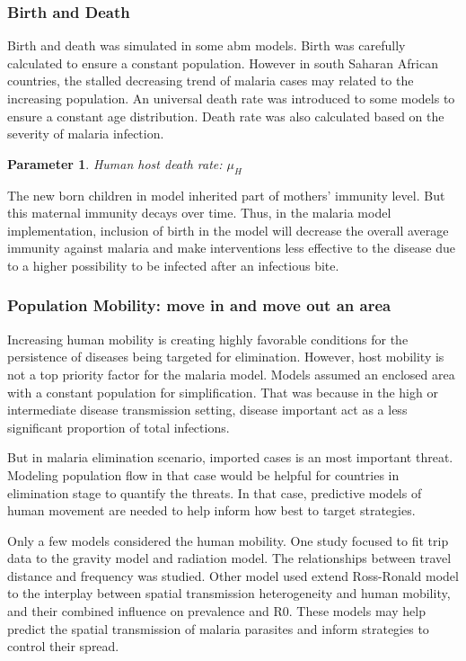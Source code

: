 \documentclass[a4paper, 12pt, twoside]{article}
\newtheorem{parameter}{Parameter}
\begin{document}
\subsubsection{Birth and Death}
Birth and death was simulated in some \gls{abm} models.
Birth was carefully calculated to ensure a constant population.
However in south Saharan African countries, the stalled decreasing trend of malaria cases may related to the increasing population.
An universal death rate was introduced to some models  to ensure a constant age distribution.
Death rate was also calculated based on the severity of malaria infection.
\begin{parameter}
	{Human host death rate:}
	{$\mu_H$}
\end{parameter}
The new born children in model inherited part of mothers' immunity level.
But this maternal immunity decays over time.
Thus, in the malaria model implementation, inclusion of birth in the model will decrease the overall average immunity against malaria and make interventions less effective to the disease due to a higher possibility to be infected after an infectious bite.

\subsubsection{Population Mobility: move in and move out an area}
Increasing human mobility is creating highly favorable conditions for the persistence of diseases being targeted for elimination.
However, host mobility is not a top priority factor for the malaria model.
Models assumed an enclosed area with a constant population for simplification.
That was because in the high or intermediate disease transmission setting, disease important act as a less significant proportion of total infections.

But in malaria elimination scenario, imported cases is an most important threat.
Modeling population flow in that case would be helpful for countries in elimination stage to quantify the threats.
In that case, predictive models of human movement are needed to help inform how best to target strategies.

Only a few models\cite{Zhu2015a} considered the human mobility.
One study focused to fit trip data to the gravity model and radiation model\cite{Marshall2018}.
The relationships between travel distance and frequency was studied.
Other model\cite{acevedo_spatial_2015} used extend Ross-Ronald model to the interplay between spatial transmission heterogeneity and human mobility, and their combined influence on prevalence and \gls{R0}.
These models may help predict the spatial transmission of malaria parasites and inform strategies to control their spread.
\end{document}
